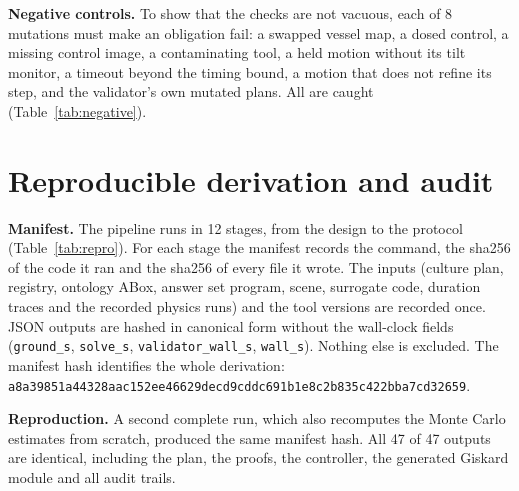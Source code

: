 \documentclass[10pt,a4paper]{article}
\begin{document}
\textbf{Negative controls.} To show that the checks are not vacuous, each of 8 mutations must make an obligation fail: a swapped vessel map, a dosed control, a missing control image, a contaminating tool, a held motion without its tilt monitor, a timeout beyond the timing bound, a motion that does not refine its step, and the validator's own mutated plans. All are caught (Table~\ref{tab:negative}).

\section{Reproducible derivation and audit}\label{sec:repro}

\textbf{Manifest.} The pipeline runs in 12 stages, from the design to the protocol (Table~\ref{tab:repro}). For each stage the manifest records the command, the sha256 of the code it ran and the sha256 of every file it wrote. The inputs (culture plan, registry, ontology ABox, answer set program, scene, surrogate code, duration traces and the recorded physics runs) and the tool versions are recorded once. JSON outputs are hashed in canonical form without the wall-clock fields (\texttt{ground\_s}, \texttt{solve\_s}, \texttt{validator\_wall\_s}, \texttt{wall\_s}). Nothing else is excluded. The manifest hash identifies the whole derivation: \texttt{a8a39851a44328aac152ee46629decd9cddc691b1e8c2b835c422bba7cd32659}.

\textbf{Reproduction.} A second complete run, which also recomputes the Monte Carlo estimates from scratch, produced the same manifest hash. All 47 of 47 outputs are identical, including the plan, the proofs, the controller, the generated Giskard module and all audit trails.
\end{document}
